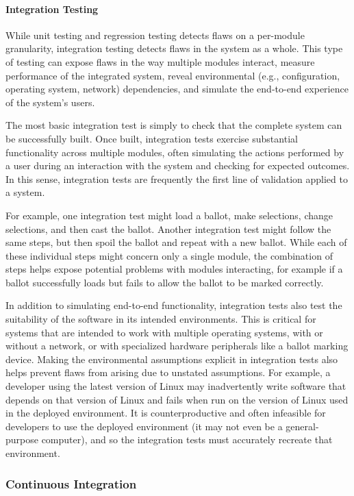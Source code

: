 \paragraph{Integration Testing}

While unit testing and regression testing detects flaws on a
per-module granularity, integration testing detects flaws in the
system as a whole. This type of testing can expose flaws in the way
multiple modules interact, measure performance of the integrated
system, reveal environmental (e.g., configuration, operating system,
network) dependencies, and simulate the end-to-end experience of the
system's users.

The most basic integration test is simply to check that the complete
system can be successfully built. Once built, integration tests
exercise substantial functionality across multiple modules, often
simulating the actions performed by a user during an interaction with
the system and checking for expected outcomes. In this sense,
integration tests are frequently the first line of validation applied
to a system.

For example, one integration test might load a ballot, make
selections, change selections, and then cast the ballot. Another
integration test might follow the same steps, but then spoil the
ballot and repeat with a new ballot. While each of these individual
steps might concern only a single module, the combination of steps
helps expose potential problems with modules interacting, for example
if a ballot successfully loads but fails to allow the ballot to be
marked correctly.

In addition to simulating end-to-end functionality, integration tests
also test the suitability of the software in its intended
environments. This is critical for systems that are intended to work
with multiple operating systems, with or without a network, or with
specialized hardware peripherals like a ballot marking device. Making
the environmental assumptions explicit in integration tests also helps
prevent flaws from arising due to unstated assumptions. For example, a
developer using the latest version of Linux may inadvertently write
software that depends on that version of Linux and fails when run on
the version of Linux used in the deployed environment. It is
counterproductive and often infeasible for developers to use the
deployed environment (it may not even be a general-purpose computer),
and so the integration tests must accurately recreate that
environment.

\subsubsection{Continuous Integration}

